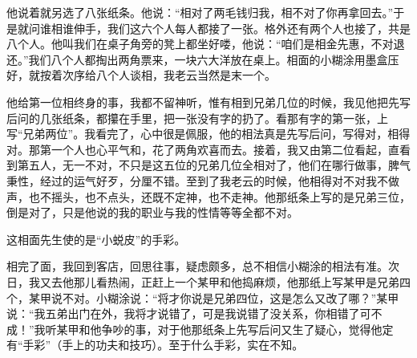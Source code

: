 \documentclass[12pt,UTF8]{ctexbook}
\begin{document}
他说着就另选了八张纸条。他说：“相对了两毛钱归我，相不对了你再拿回去。”于是就问谁相谁伸手，我们这六个人每人都接了一张。格外还有两个人也接了，共是八个人。他叫我们在桌子角旁的凳上都坐好喽，他说：“咱们是相金先惠，不对退还。”我们八个人都掏出两角票来，一块六大洋放在桌上。相面的小糊涂用墨盒压好，就按着次序给八个人谈相，我老云当然是末一个。

他给第一位相终身的事，我都不留神听，惟有相到兄弟几位的时候，我见他把先写后问的几张纸条，都攥在手里，把一张没有字的扔了。看那有字的第一张，上写“兄弟两位”。我看完了，心中很是佩服，他的相法真是先写后问，写得对，相得对。那第一个人也心平气和，花了两角欢喜而去。接着，我又由第二位看起，直看到第五人，无一不对，不只是这五位的兄弟几位全相对了，他们在哪行做事，脾气秉性，经过的运气好歹，分厘不错。至到了我老云的时候，他相得对不对我不做声，也不摇头，也不点头，还既不定神，也不走神。他那纸条上写的是兄弟三位，倒是对了，只是他说的我的职业与我的性情等等全都不对。

这相面先生使的是“小蜕皮”的手彩。



相完了面，我回到客店，回思往事，疑虑颇多，总不相信小糊涂的相法有准。次日，我又去他那儿看热闹，正赶上一个某甲和他捣麻烦，他那纸上写某甲是兄弟四个，某甲说不对。小糊涂说：“将才你说是兄弟四位，这是怎么又改了哪？”某甲说：“我五弟出门在外，我将才说错了，可是我说错了没关系，你相错了可不成！”我听某甲和他争吵的事，对于他那纸条上先写后问又生了疑心，觉得他定有“手彩”（手上的功夫和技巧）。至于什么手彩，实在不知。
\end{document}
